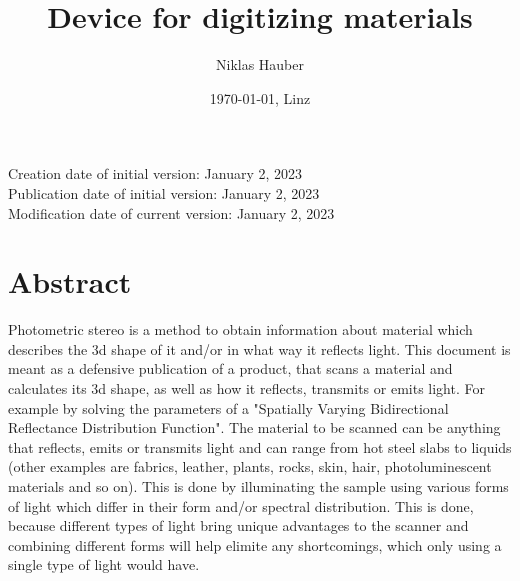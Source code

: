 \documentclass[11pt, twoside, listof=totocnumbered, bibliography=totocnumbered]{scrartcl}
\title{Device for digitizing materials}
\author{Niklas Hauber}
\date{\today{}, Linz}
\begin{document}
\maketitle
Creation date of initial version: January 2, 2023\\
Publication date of initial version: January 2, 2023\\
Modification date of current version: January 2, 2023\\

\section{Abstract}
Photometric stereo is a method to obtain information about material which describes the 3d shape of it and/or in what way it reflects light. This document is meant as a defensive publication of a product, that scans a material and calculates its 3d shape, as well as how it reflects, transmits or emits light. For example by solving the parameters of a "Spatially Varying Bidirectional Reflectance Distribution Function". The material to be scanned can be anything that reflects, emits or transmits light and can range from hot steel slabs to liquids (other examples are fabrics, leather, plants, rocks, skin, hair, photoluminescent materials and so on). This is done by illuminating the sample using various forms of light which differ in their form and/or spectral distribution. This is done, because different types of light bring unique advantages to the scanner and combining different forms will help elimite any shortcomings, which only using a single type of light would have. \cite{SURVEY}
\end{document}
